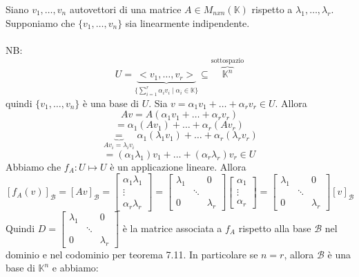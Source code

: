 \documentclass[12pt]{article}
\begin{document}
Siano $v_1, \dots, v_n$ autovettori di una matrice $A \in M_{nxn} (\mathbb{K})$ rispetto a $\lambda_1, \dots, \lambda_r$. Supponiamo che $\{v_1, \dots, v_n\}$ sia linearmente indipendente.
\\\\
NB:
\[U =  \underbrace{<v_1, \dots, v_r>}_{\{\sum^r_{i=1} \alpha_i v_i \mid \alpha_i \in \mathbb{K}\}} \subseteq \overbrace{\mathbb{K}^n}^{\text{sottospazio}}\]
quindi $\{v_1, \dots, v_n\}$ è una base di $U$.
Sia $v = \alpha_1 v_1 + \dots + \alpha_r v_r \in U$. Allora
\[Av = A(\alpha_1v_1 + \dots + \alpha_rv_r)\]
\[= \alpha_1 (Av_1) + \dots + \alpha_r (Av_r)\]
\[\underbrace{=}_{Av_i = \lambda_iv_i} \alpha_1(\lambda_1v_1) + \dots + \alpha_r(\lambda_r v_r)\]
\[= (\alpha_1\lambda_1)v_1 + \dots + (\alpha_r \lambda_r)v_r \in U\]
Abbiamo che $f_A: U \mapsto U$ è un applicazione lineare. Allora
\[[f_A(v)]_{\mathcal{B}} = [Av]_{\mathcal{B}} = \begin{bmatrix}
\alpha_1\lambda_1\\
\vdots\\
\alpha_r\lambda_r
\end{bmatrix} = \begin{bmatrix}
    \lambda_1 & & 0\\
    & \ddots &\\
    0 & & \lambda_r
\end{bmatrix} \begin{bmatrix}
    \alpha_1\\
    \vdots\\
    \alpha_r
\end{bmatrix} = \begin{bmatrix}
    \lambda_1 & & 0\\
    & \ddots &\\
    0 & & \lambda_r
\end{bmatrix} [v]_{\mathcal{B}}\]
Quindi $D = \begin{bmatrix}
    \lambda_1 & & 0\\
    & \ddots &\\
    0 & & \lambda_r
\end{bmatrix}$ è la matrice associata a $f_A$ rispetto alla base $\mathcal{B}$ nel dominio e nel codominio per teorema 7.11. In particolare se $n = r$, allora $\mathcal{B}$ è una base di $\mathbb{K}^n$ e abbiamo:
\end{document}
